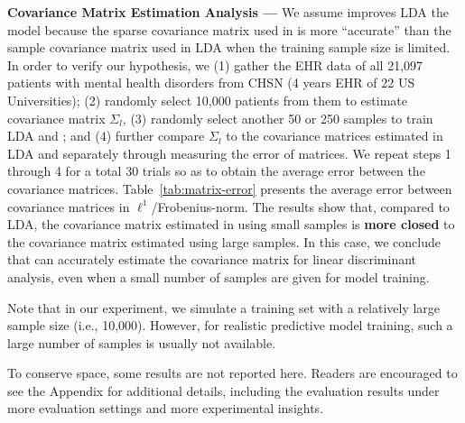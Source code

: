 


\textbf{Covariance Matrix Estimation Analysis --- } We assume \TheName{} improves LDA the model because the sparse covariance matrix used in \TheName{} is more ``accurate'' than the sample covariance matrix used in LDA when the training sample size is limited. 
In order to verify our hypothesis, we (1) gather the EHR data of all 21,097 patients with mental health disorders from CHSN (4 years EHR of 22 US Universities); (2) randomly select 10,000 patients from them to estimate covariance matrix $\Sigma_l$, (3) randomly select another 50 or 250 samples to train LDA and \TheName; and (4) further compare $\Sigma_l$ to the covariance matrices estimated in LDA and \TheName{} separately through measuring the error of matrices. 
We repeat steps 1 through 4 for a total 30 trials so as to obtain the average error between the covariance matrices. 
Table~\ref{tab:matrix-error} presents the average error between covariance matrices in $\ell^1$/Frobenius-norm. 
%
The results show that, compared to LDA, the covariance matrix estimated in \TheName{} using small samples is \textbf{more closed} to the covariance matrix estimated using large samples. 
In this case, we conclude that \TheName{} can accurately estimate the covariance matrix for linear discriminant analysis, even when a small number of samples are given for model training. 

Note that in our experiment, we simulate a training set with a relatively large sample size (i.e., 10,000). 
However, for realistic predictive model training, such a large number of samples is usually not available.


To conserve space, some results are not reported here. 
Readers are encouraged to see the Appendix for additional details, including the evaluation results under more evaluation settings and more experimental insights.
